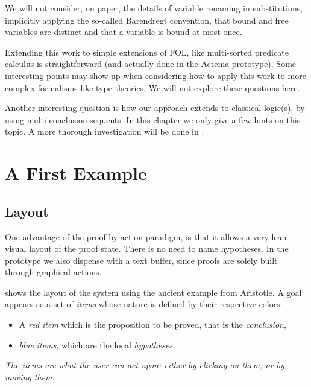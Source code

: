 We will not consider, on paper, the details of variable renaming in
substitutions, implicitly applying the so-called Barendregt
convention, that bound and free variables are distinct and that a
variable is bound at most once.

Extending this work to simple extensions of FOL, like multi-sorted predicate
calculus is straightforward (and actually done in the Actema prototype).  Some
interesting points may show up when considering how to apply this work to more
complex formalisms like type theories. We will not explore these questions here.

Another interesting question is how our approach extends to classical logic(s),
by using multi-conclusion sequents. In this chapter we only give a few hints on
this topic. A more thorough investigation will be done in
.

\section{A First Example}

\subsection{Layout}
One advantage of the proof-by-action paradigm, is that it allows a very lean
visual layout of the proof state. There is no need to name hypotheses. In the
prototype we also dispense with a text buffer, since proofs are solely built
through graphical actions.


 shows the layout of the system using the
ancient example from Aristotle. A goal appears as a set of {\em items}
whose nature is defined by their respective colors:
\begin{itemize}
\item A {\em red item} which is the proposition to be proved, that is the
 {\em conclusion},
\item {\em blue items}, which are the local {\em hypotheses}.
\end{itemize}

{\em The items are what the user can act upon: either by {\em clicking} on
them, or by {\em moving} them.}

